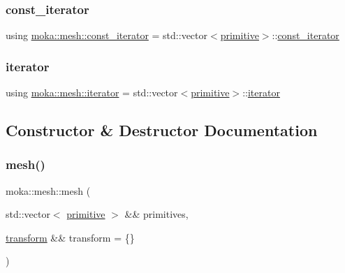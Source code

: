 \subsubsection{\texorpdfstring{const\_iterator}{const\_iterator}}
{\footnotesize\ttfamily using \mbox{\hyperlink{classmoka_1_1mesh_aea68be7cc8e79b9825775f199562bf90}{moka\+::mesh\+::const\+\_\+iterator}} =  std\+::vector$<$\mbox{\hyperlink{classmoka_1_1primitive}{primitive}}$>$\+::\mbox{\hyperlink{classmoka_1_1mesh_aea68be7cc8e79b9825775f199562bf90}{const\+\_\+iterator}}}

\mbox{\label{classmoka_1_1mesh_a89827e48d6ebf6481c9a923042324756}} 
\subsubsection{\texorpdfstring{iterator}{iterator}}
{\footnotesize\ttfamily using \mbox{\hyperlink{classmoka_1_1mesh_a89827e48d6ebf6481c9a923042324756}{moka\+::mesh\+::iterator}} =  std\+::vector$<$\mbox{\hyperlink{classmoka_1_1primitive}{primitive}}$>$\+::\mbox{\hyperlink{classmoka_1_1mesh_a89827e48d6ebf6481c9a923042324756}{iterator}}}



\subsection{Constructor \& Destructor Documentation}
\mbox{\label{classmoka_1_1mesh_a915acb830920bfea3dbae1d343048ada}} 
\subsubsection{\texorpdfstring{mesh()}{mesh()}\hspace{0.1cm}{\footnotesize\ttfamily [1/2]}}
{\footnotesize\ttfamily moka\+::mesh\+::mesh (\begin{DoxyParamCaption}\item[{std\+::vector$<$ \mbox{\hyperlink{classmoka_1_1primitive}{primitive}} $>$ \&\&}]{primitives,  }\item[{\mbox{\hyperlink{classmoka_1_1transform}{transform}} \&\&}]{transform = {\ttfamily \{\}} }\end{DoxyParamCaption})\hspace{0.3cm}{\ttfamily [explicit]}}

